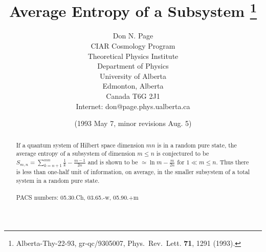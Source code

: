 \documentclass[12pt]{article}
\begin{document}
\title{Average Entropy of a Subsystem \thanks
{Alberta-Thy-22-93, gr-qc/9305007, Phys.\ Rev.\ Lett. {\bf 71}, 1291
(1993).}}
\author{ Don N. Page\\
CIAR Cosmology Program\\
Theoretical Physics Institute\\
Department of Physics\\University of Alberta\\
Edmonton, Alberta\\Canada T6G 2J1\\
Internet:  don@page.phys.ualberta.ca}
\date{(1993 May 7, minor revisions Aug. 5)}
\maketitle

\begin{abstract}
If a quantum system of Hilbert space dimension $mn$ is in a random
pure state,
the average entropy of a subsystem of dimension $m\leq n$ is
conjectured to be
$S_{m,n}=\sum_{k=n+1}^{mn}\frac{1}{k} - \frac{m-1}{2n}$ and is shown
to be
$\simeq \ln m - \frac{m}{2n}$ for $1\ll m\leq n$.  Thus there is less
than
one-half unit of information, on average, in the smaller subsystem of
a total
system in a random pure state.
\\
\\
PACS numbers: 05.30.Ch, 03.65.-w, 05.90.+m
\end{abstract}
\normalsize
\pagebreak
\end{document}
